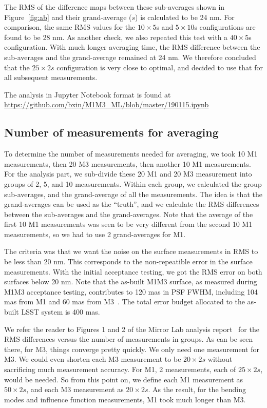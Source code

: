 \documentclass [twoside,openbib,12pt]{article}
\begin{document}
The RMS of the difference maps between these sub-averages shown in Figure~\ref{fig:ab} and their
grand-average ($s$) is calculated to be 24 nm.
For comparison, the same RMS values for the $10 \times 5$s and $5
\times 10$s configurations are found to be 28 nm.
As another check, we also repeated this test with a $40 \times 5$s
configuration. With much longer averaging time, the RMS difference
between the sub-averages and the grand-average remained at 24 nm.
We therefore concluded that the $25 \times 2s$ configuration is very
close to optimal, and decided to use that for all subsequent
measurements.

The analysis in Jupyter Notebook format is found at
\url{https://github.com/bxin/M1M3_ML/blob/master/190115.ipynb}

\subsection{Number of measurements for averaging}

To determine the number of measurements needed for averaging, we took
10 M1 measurements, then 20 M3 measurements, then another 10 M1
measurements.
For the analysis part, we sub-divide these 20 M1 and 20 M3 measurement
into groups of 2, 5, and 10 measurements. Within each group, we
calculated the group sub-averages, and the grand-average of all the
measurements.
The idea is that the grand-averages can be used as the ``truth'', and
we calculate the RMS differences between the sub-averages and the grand-averages.
Note that the average of the first 10 M1 measurements
was seen to be very different from the second 10 M1 measurements, so
we had to use 2 grand-averages for M1. 

The criteria was that we want the noise on the surface measurements in
RMS to be less than 20 nm. This corresponds to the non-repeatible
error in the surface measurements. With the initial acceptance
testing, we got the RMS error on both surfaces below 20 nm. Note that
the as-built M1M3 surface, as measured during M1M3 acceptance testing,
contributes to 120 mas in PSF FWHM, including 104 mas from M1 and 60
mas from M3~\cite{m1m3perf}. The total error budget allocated to the as-built LSST
system is 400 mas.

We refer the reader to Figures
1 and 2 of the Mirror Lab analysis report~\cite{m1m3UAreport}
for the RMS differences
versus the number of measurements in groups.
As can be seen there, for M3, things converge pretty quickly. We only
need one measurement for M3. We could even shorten each M3 measurement
to be $20 \times 2s$ without sacrificing much measurement accuracy.
For M1, 2 measurements, each of $25 \times 2s$, would be needed.
So from this point on, we define each M1 measurement as $50 \times
2s$, and each M3 measurement as $20 \times 2s$.
As the result, for the bending modes and influence function
measurements, M1 took much longer than M3.
\end{document}
